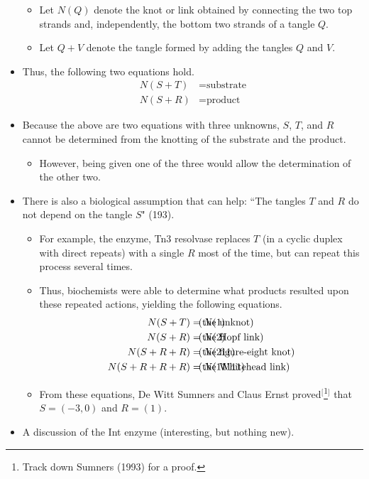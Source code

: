 \documentclass[titlepage]{article}
\numberwithin{figure}{section}
\numberwithin{table}{section}
\numberwithin{equation}{section}
\newcommand{\dq}[2]{``#1" (#2).}
\begin{document}
\begin{itemize}
\begin{itemize}
        \item Let $N(Q)$ denote the knot or link obtained by connecting the two top strands and, independently, the bottom two strands of a tangle $Q$.
        \item Let $Q+V$ denote the tangle formed by adding the tangles $Q$ and $V$.
    \end{itemize}
    \item Thus, the following two equations hold.
    \begin{align*}
        N(S+T) &= \text{substrate}\\
        N(S+R) &= \text{product}
    \end{align*}
    \item Because the above are two equations with three unknowns, $S$, $T$, and $R$ cannot be determined from the knotting of the substrate and the product.
    \begin{itemize}
        \item However, being given one of the three would allow the determination of the other two.
    \end{itemize}
    \item There is also a biological assumption that can help: \dq{The tangles $T$ and $R$ do not depend on the tangle $S$}{193}
    \begin{itemize}
        \item For example, the enzyme, Tn3 resolvase replaces $T$ (in a cyclic duplex with direct repeats) with a single $R$ most of the time, but can repeat this process several times.
        \item Thus, biochemists were able to determine what products resulted upon these repeated actions, yielding the following equations.
        \begin{align*}
            N(S+T)     &= N(1)     & &\hspace{-2cm}(\text{the unknot})\\
            N(S+R)     &= N(2)     & &\hspace{-2cm}(\text{the Hopf link})\\
            N(S+R+R)   &= N(211)   & &\hspace{-2cm}(\text{the figure-eight knot})\\
            N(S+R+R+R) &= N(11111) & &\hspace{-2cm}(\text{the Whitehead link})\\
        \end{align*}
        \item From these equations, De Witt Sumners and Claus Ernst proved$^[$\footnote{Track down Sumners (1993) for a proof.}$^]$ that $S=(-3,0)$ and $R=(1)$.
    \end{itemize}
    \item A discussion of the Int enzyme (interesting, but nothing new).
\end{itemize}
\end{document}

